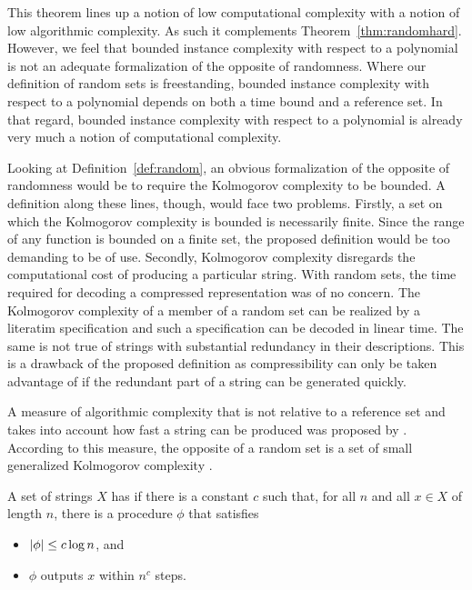 This theorem lines up a notion of low computational complexity with a notion of low algorithmic complexity.
As such it complements Theorem~\ref{thm:randomhard}.
However, we feel that bounded instance complexity with respect to a polynomial is not an adequate formalization of the opposite of randomness.
Where our definition of random sets is freestanding, bounded instance complexity with respect to a polynomial depends on both a time bound and a reference set.
In that regard, bounded instance complexity with respect to a polynomial is already very much a notion of computational complexity.

Looking at Definition~\ref{def:random}, an obvious formalization of the opposite of randomness would be to require the Kolmogorov complexity to be bounded.
A definition along these lines, though, would face two problems.
Firstly, a set on which the Kolmogorov complexity is bounded is necessarily finite.
Since the range of any function is bounded on a finite set, the proposed definition would be too demanding to be of use.
Secondly, Kolmogorov complexity disregards the computational cost of producing a particular string.
With random sets, the time required for decoding a compressed representation was of no concern.
The Kolmogorov complexity of a member of a random set can be realized by a literatim specification and such a specification can be decoded in linear time.
The same is not true of strings with substantial redundancy in their descriptions.
This is a drawback of the proposed definition as compressibility can only be taken advantage of if the redundant part of a string can be generated quickly.

A measure of algorithmic complexity that is not relative to a reference set and takes into account how fast a string can be produced was proposed by \textcite{hartmanis1983generalized}.
According to this measure, the opposite of a random set is a set of small generalized Kolmogorov complexity \parencite{balcazar1986sets,allender1988p-printable}.
\begin{definition}
  A set of strings $X$ has  if there is a constant $c$ such that, for all $n$ and all $x \in X$ of length $n$, there is a procedure $\phi$ that satisfies
  \begin{itemize}
  \item ${\lvert\phi\rvert} \le c\log n$, and
  \item $\phi$ outputs $x$ within $n^c$ steps.
  \end{itemize}
\end{definition}

